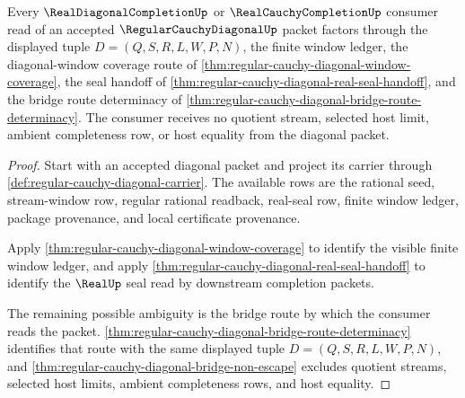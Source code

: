 \begin{theorem}
\label{thm:regular-cauchy-diagonal-mature-consumer-exhaustion}
Every $\RealDiagonalCompletionUp$ or $\RealCauchyCompletionUp$ consumer read of an accepted $\RegularCauchyDiagonalUp$ packet factors through the displayed tuple $D=(Q,S,R,L,W,P,N)$, the finite window ledger, the diagonal-window coverage route of \autoref{thm:regular-cauchy-diagonal-window-coverage}, the seal handoff of \autoref{thm:regular-cauchy-diagonal-real-seal-handoff}, and the bridge route determinacy of \autoref{thm:regular-cauchy-diagonal-bridge-route-determinacy}. The consumer receives no quotient stream, selected host limit, ambient completeness row, or host equality from the diagonal packet.
\end{theorem}
\begin{proof}
Start with an accepted diagonal packet and project its carrier through \autoref{def:regular-cauchy-diagonal-carrier}. The available rows are the rational seed, stream-window row, regular rational readback, real-seal row, finite window ledger, package provenance, and local certificate provenance.

Apply \autoref{thm:regular-cauchy-diagonal-window-coverage} to identify the visible finite window ledger, and apply \autoref{thm:regular-cauchy-diagonal-real-seal-handoff} to identify the $\RealUp$ seal read by downstream completion packets.

The remaining possible ambiguity is the bridge route by which the consumer reads the packet. \autoref{thm:regular-cauchy-diagonal-bridge-route-determinacy} identifies that route with the same displayed tuple $D=(Q,S,R,L,W,P,N)$, and \autoref{thm:regular-cauchy-diagonal-bridge-non-escape} excludes quotient streams, selected host limits, ambient completeness rows, and host equality.
\end{proof}

